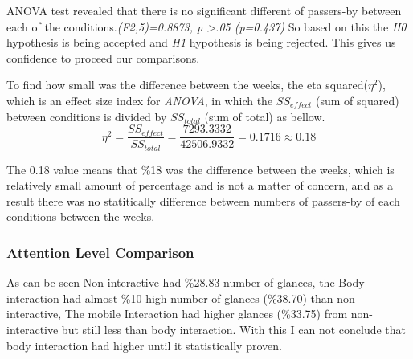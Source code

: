 \begin{table}[H]
\caption{Number of passerby in three weeks}
\label{tab:passerbyofthreeweeks}
\centering
{}
\end{table}

ANOVA test revealed that there is no significant different of passers-by between each of the conditions.\emph{(F2,5)=0.8873, p >.05 (p=0.437)}
So based on this the \emph{H0} hypothesis is being accepted and \emph{H1} hypothesis is being rejected. This gives us confidence to proceed our comparisons.

To find how small was the difference between the weeks, the eta squared(${\eta}^2$), which is an effect size index for \emph{ANOVA}, in which the $SS_{effect}$ (sum of squared) between conditions is divided by $SS_{total}$  (sum of total) as bellow.
\[
{\eta}^2 = \frac{{SS}_{effect}}{{SS}_{total}} = \frac{7293.3332}{42506.9332} = 0.1716\approx 0.18
\]

The 0.18 value means that \%18 was the difference between the weeks, which is relatively small amount of percentage and is not a matter of concern, and as a result there was no statitically difference between numbers of passers-by of each conditions between the weeks.




\subsubsection {Attention Level Comparison}
As can be seen Non-interactive had \%28.83 number of glances, the Body-interaction had almost \%10 high number of glances (\%38.70) than non-interactive, The mobile Interaction had higher glances (\%33.75) from non-interactive but still less than body interaction.  With this I can not conclude that body interaction had higher until it statistically proven.

